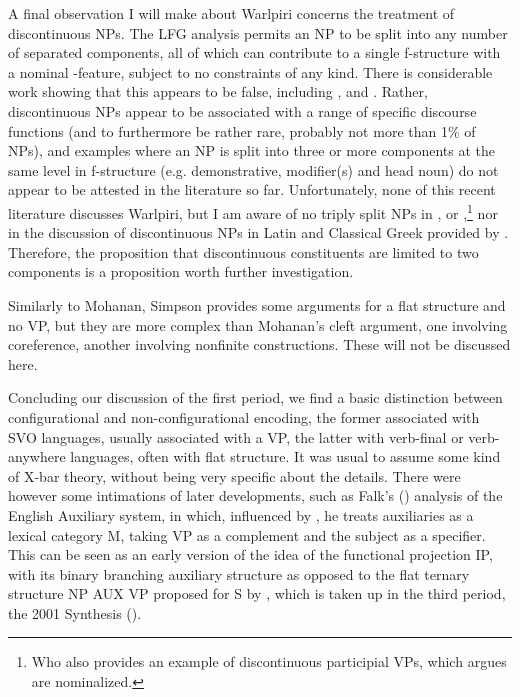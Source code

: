 \documentclass[output=paper,hidelinks]{langscibook}
\begin{document}
A final observation I will make about Warlpiri concerns the treatment of discontinuous
NPs.  The LFG analysis permits an NP to be split into any number of separated
components, all of which can contribute to a single f-structure with a nominal
\PRED-feature, subject to no constraints of any kind.  There is considerable work
showing that this appears to be false, including \citet{SchuSima12}, \citet{Schultze-Berndt2022}
and \citet{LouaVers16}. Rather, discontinuous NPs appear to be associated
with a range of specific discourse functions (and to furthermore be rather rare, probably
not more than 1\% of NPs), and examples where an NP is split into three or more
components at the same level in f-structure (e.g. demonstrative, modifier(s) and head noun)
do not appear to be attested in the literature so far.  
Unfortunately, none of this recent literature discusses Warlpiri, but I am aware of no
triply split NPs in \citet{Simpson1983, Simpson1991}, \citet{Nash1986} or
\citet{Laughren1989},\footnote
 {Who also provides an example of discontinuous participial VPs, which \citet{Simpson1991}
 argues are nominalized.}
nor in the discussion of discontinuous NPs in Latin and Classical Greek provided by
\citet{DevineStephens2000}. Therefore, the proposition that discontinuous constituents are
limited to two components is a proposition worth further investigation.

Similarly to Mohanan, Simpson provides some arguments for a flat structure and no VP,
but they are more complex than Mohanan's cleft argument, one involving coreference,
another involving nonfinite constructions.  These will not be discussed here.

Concluding our discussion of the first period, we find a basic distinction between configurational
and non-configurational encoding, the former associated with SVO languages,
usually associated with a VP, the latter with verb-final or verb-anywhere languages,
often with flat structure.  It was usual to assume some kind of X-bar
theory, without being very specific about the details.  There were however some
intimations of later developments, such as Falk's (\citeyear{Falk84}) analysis
of the English Auxiliary system, in which, influenced by \citet{jackendoff1977}, he treats
auxiliaries as a lexical category M, taking VP as a complement and the subject
as a specifier.  This can be seen as an early version of the idea of the functional
projection IP, with its binary  branching auxiliary structure as opposed to the
flat ternary structure NP AUX VP proposed for S by \citet{AkmajianSteeleWasow1979},
which is taken up in the third period, the 2001 Synthesis ().
\end{document}
